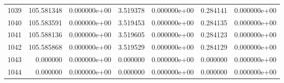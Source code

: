 \begin{tabular}{rrrrrrr}
1039 & 105.581348 &  0.000000e+00 &  3.519378 &  0.000000e+00 &   0.284141 &  0.000000e+00 \\
1040 & 105.583591 &  0.000000e+00 &  3.519453 &  0.000000e+00 &   0.284135 &  0.000000e+00 \\
1041 & 105.588136 &  0.000000e+00 &  3.519605 &  0.000000e+00 &   0.284123 &  0.000000e+00 \\
1042 & 105.585868 &  0.000000e+00 &  3.519529 &  0.000000e+00 &   0.284129 &  0.000000e+00 \\
1043 &   0.000000 &  0.000000e+00 &  0.000000 &  0.000000e+00 &   0.000000 &  0.000000e+00 \\
1044 &   0.000000 &  0.000000e+00 &  0.000000 &  0.000000e+00 &   0.000000 &  0.000000e+00 \\
\bottomrule
\end{tabular}
